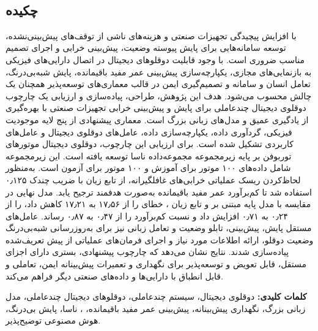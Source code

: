 
\setcounter{page}{1}
\thispagestyle{empty}

~\vfill

\subsection*{چکیده}
\begin{small}
\baselineskip=0.7cm

با افزایش پیچیدگی تجهیزات صنعتی و هزینه‌های ناشی از توقف‌های پیش‌بینی‌نشده، توسعه سامانه‌هایی برای پایش پیوسته وضعیت، پیش‌بینی خرابی و اجرای تصمیم مناسب ضروری است. با وجود قابلیت دوقلوهای دیجیتال در اتصال دارایی‌های فیزیکی به بازنمایی‌های مجازی، یکپارچه‌سازی پیش‌بینی عمر مفید باقیمانده، پایش شبه‌بی‌درنگ، تعامل انسان و سامانه و تصمیم‌گیری ایمن در قالب معماری‌های توسعه‌پذیر همچنان یک چالش محسوب می‌شود. هدف این پژوهش، طراحی، پیاده‌سازی و ارزیابی یک چارچوب دوقلوی دیجیتال چندعاملی برای پایش و پیش‌بینی خرابی تجهیزات صنعتی با بهره‌گیری از یادگیری عمیق و مدل‌های زبانی بزرگ است. معماری پیشنهادی از پنج لایه موجودیت فیزیکی، گردآوری داده، یکپارچه‌سازی داده، عامل‌های دوقلوی دیجیتال و عامل‌های کاربردی تشکیل شده است. برای ارزیابی این چارچوب، دوقلوی دیجیتال موتورهای توربوفن بر پایه زیرمجموعه  مجموعه‌داده
ناسا توسعه یافته است. این زیرمجموعه شامل داده‌های ۱۰۰ موتور برای آموزش و ۱۰۰ موتور برای آزمون است. به‌منظور لحاظ‌کردن ریسک عملیاتی خرابی‌های غافلگیرانه، از تابع زیان 
 با ضریب چندک ۰٫۱۲۵ استفاده شد تا کم‌برآورد عمر مفید باقیمانده به‌صورت هدفمند ترجیح یابد. مدل نهایی در مقایسه با مدل پایه مبتنی بر  و تابع زیان ، خطای  را از ۱۷٫۵۶ به ۱۷٫۲۱ کاهش داد،  را از ۰٫۲۴ به ۰٫۷۱ افزایش داد و نسبت کم‌برآورد را از ۰٫۴۷ به ۰٫۸۷ رساند. عامل‌های مستقل پایش، پیش‌بینی، تابلو وضعیت و تعامل زبانی نیز برای به‌روزرسانی شبه‌بی‌درنگ وضعیت دوقلو، ارائه اطلاعات مورد نیاز و اجرای فرمان‌های عملیاتی از پیش‌ تعریف‌شده پیاده‌سازی شدند. نتایج نشان می‌دهد که چارچوب پیشنهادی، بستری دارای اجزای مستقل، قابل تعویض و توسعه‌پذیر برای نگهداری و تعمیرات پیش‌بینانه ایمن، تعاملی و قابل انطباق با دارایی‌ها و داده‌های صنعتی دیگر فراهم می‌کند.


\vspace*{0.7 cm}
\noindent\textbf{کلمات کلیدی:}
دوقلوی دیجیتال، سیستم چندعاملی، دوقلوهای دیجیتال چندعاملی، مدل زبانی بزرگ، نگهداری پیش‌بینانه، پیش‌بینی عمر مفید باقیمانده، 
،
ناسا،
 پایش بی‌درنگ، هوش مصنوعی توضیح‌پذیر.
\end{small}